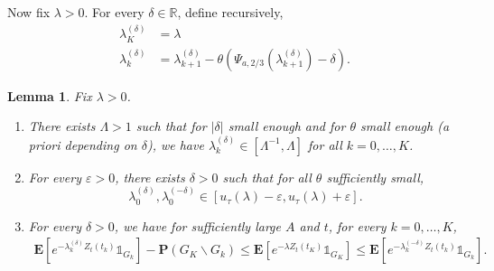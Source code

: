 \documentclass[10pt]{amsart}
\newtheorem{lemm}[theo]{Lemma}\newtheorem{prop}[theo]{Proposition}\newtheorem{coro}[theo]{Corollary}\newtheorem{conj}[theo]{Conjecture}
\theoremstyle{definition}\newtheorem{defi}[theo]{Definition}\newtheorem{rema}[theo]{Remark}\newtheorem{exam}[theo]{Example}\newtheorem{exem}[theo]{Example}\newtheorem{nota}[theo]{Notation}
\newcommand*\eps{\varepsilon}
\newcommand*\E{\mathbf{E}}
\renewcommand*\P{\mathbf{P}}
\newcommand*\R{\mathbb{R}}
\newcommand{\1} {\mathds{1}}
\begin{document}
Now fix $\lambda > 0$. For every $\delta \in\R$, define recursively,
\begin{align*}
\lambda_K^{(\delta)} &= \lambda\\
\lambda_k^{(\delta)} &= \lambda_{k+1}^{(\delta)} - \theta\left(\Psi_{a,2/3}\left(\lambda_{k+1}^{(\delta)}\right) - \delta\right).
\end{align*}

\begin{lemm}\label{lem:csbp_lambda_delta}
Fix $\lambda > 0$.
\begin{enumerate}
\item There exists $\Lambda > 1$ such that for $|\delta|$ small enough and for $\theta$ small enough (a priori depending on $\delta$), we have $\lambda_k^{(\delta)} \in [\Lambda^{-1},\Lambda]$ for all $k=0,\ldots,K$.
\item For every $\eps>0$, there exists $\delta > 0$ such that for all $\theta$ sufficiently small,
\[
\lambda_0^{(\delta)},\lambda_0^{(-\delta)} \in \left[u_\tau(\lambda)-\eps,u_\tau(\lambda)+\eps\right].
\]
\item For every $\delta>0$, we have for sufficiently large $A$ and $t$, for every $k=0,\ldots,K$,
\begin{align}\label{eq:752}
\E\left[e^{-\lambda_k^{(\delta)}Z_t(t_k)}\1_{G_k}\right] -\P\left(G_K\backslash G_k\right) \le \E\left[e^{-\lambda Z_t(t_K)}\1_{G_K}\right] \le \E\left[e^{-\lambda_k^{(-\delta)}Z_t(t_k)}\1_{G_k}\right].
\end{align}
\end{enumerate}
\end{lemm}
\end{document}
